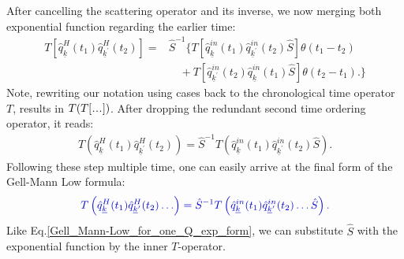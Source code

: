\documentclass[
12pt, %
english, %
singlespacing, %
headsepline, %
]{MastersDoctoralThesis} %
\newcommand\mydots{\makebox[1em][c]{.\hfil.\hfil.}}
\begin{document}
After cancelling the scattering operator and its inverse, we now merging both exponential function regarding the earlier time:
\begin{equation}
\begin{split}
T\left[
\hat{q}^{H}_{\underline{k}}(t_1)
\hat{q}^{H}_{\underline{k}^{\prime}}(t_2)
\right]=
&\hat{S}^{-1}
\Big\{
T\left[
	\hat{q}^{in}_{\underline{k}}(t_1)
	\hat{q}^{in}_{\underline{k}^{\prime}}(t_2)
	\hat{S}
\right]
				  \theta(t_1 - t_2)
	\\				  
				 &\quad +
T\left[
	\hat{q}^{in}_{\underline{k}^{\prime}}(t_2)
	\hat{q}^{in}_{\underline{k}}(t_1)
	\hat{S}
\right]
        \theta(t_2 - t_1).
    \Big\}  
    \end{split}
\end{equation}
Note, rewriting our notation using cases back to the chronological time operator $ T $, results in $ T(T[\mydots]) $. After dropping the redundant second time ordering operator, it reads:
\begin{equation}\label{Gell-Mann_Low_formula_for_2}
\begin{split}
T\left( 
\hat{q}^{H}_{\underline{k}}(t_1)
\hat{q}^{H}_{\underline{k}^{\prime}}(t_2)
\right) 
=
\hat{S}^{-1}
T\left( 
\hat{q}^{in}_{\underline{k}}(t_1)
\hat{q}^{in}_{\underline{k}^{\prime}}(t_2)
\hat{S}
\right).
    \end{split}
\end{equation}
Following these step multiple time, one can easily  arrive at the final form of the Gell-Mann Low formula:
\begin{equation}\label{Gell-Mann_Low_formula}
\begin{split}
\textcolor[RGB]{0,0,204}{
T\left( 
\hat{q}^{H}_{\underline{k}}(t_1)
\hat{q}^{H}_{\underline{k}^{\prime}}(t_2)
\ldots
\right) 
=
\hat{S}^{-1}
T\left( 
\hat{q}^{in}_{\underline{k}}(t_1)
\hat{q}^{in}_{\underline{k}^{\prime}}(t_2)
\ldots
\hat{S}
\right).
}
    \end{split}
\end{equation}
Like Eq.\enskip\eqref{Gell_Mann-Low_for_one_Q_exp_form}, we can substitute  $ \hat{S} $ with the exponential function by the inner $ T $-operator. 
\end{document}
